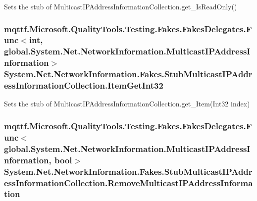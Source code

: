 Sets the stub of Multicast\-I\-P\-Address\-Information\-Collection.\-get\-\_\-\-Is\-Read\-Only()

\hypertarget{class_system_1_1_net_1_1_network_information_1_1_fakes_1_1_stub_multicast_i_p_address_information_collection_a4fd9bfbe6949384f591935083bf9813c}{
\subsubsection[{Item\-Get\-Int32}]{\setlength{\rightskip}{0pt plus 5cm}mqttf.\-Microsoft.\-Quality\-Tools.\-Testing.\-Fakes.\-Fakes\-Delegates.\-Func$<$int, global.\-System.\-Net.\-Network\-Information.\-Multicast\-I\-P\-Address\-Information$>$ System.\-Net.\-Network\-Information.\-Fakes.\-Stub\-Multicast\-I\-P\-Address\-Information\-Collection.\-Item\-Get\-Int32}}\label{class_system_1_1_net_1_1_network_information_1_1_fakes_1_1_stub_multicast_i_p_address_information_collection_a4fd9bfbe6949384f591935083bf9813c}


Sets the stub of Multicast\-I\-P\-Address\-Information\-Collection.\-get\-\_\-\-Item(\-Int32 index)

\hypertarget{class_system_1_1_net_1_1_network_information_1_1_fakes_1_1_stub_multicast_i_p_address_information_collection_a502d0d89d250519ffd723f7e856f0297}{
\subsubsection[{Remove\-Multicast\-I\-P\-Address\-Information}]{\setlength{\rightskip}{0pt plus 5cm}mqttf.\-Microsoft.\-Quality\-Tools.\-Testing.\-Fakes.\-Fakes\-Delegates.\-Func$<$global.\-System.\-Net.\-Network\-Information.\-Multicast\-I\-P\-Address\-Information, bool$>$ System.\-Net.\-Network\-Information.\-Fakes.\-Stub\-Multicast\-I\-P\-Address\-Information\-Collection.\-Remove\-Multicast\-I\-P\-Address\-Information}}\label{class_system_1_1_net_1_1_network_information_1_1_fakes_1_1_stub_multicast_i_p_address_information_collection_a502d0d89d250519ffd723f7e856f0297}


